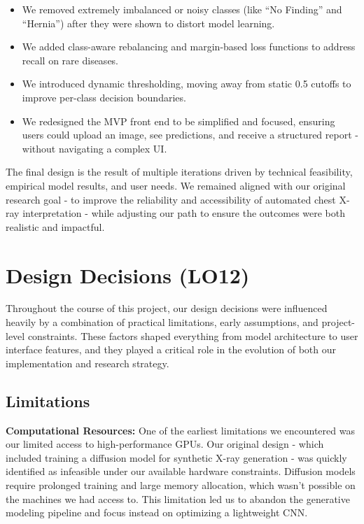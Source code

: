 \documentclass{article}
\begin{document}
\begin{itemize}
    \item We removed extremely imbalanced or noisy classes (like ``No Finding'' and ``Hernia'') after they were shown to distort model learning.
    \item We added class-aware rebalancing and margin-based loss functions to address recall on rare diseases.
    \item We introduced dynamic thresholding, moving away from static 0.5 cutoffs to improve per-class decision boundaries.
    \item We redesigned the MVP front end to be simplified and focused, ensuring users could upload an image, see predictions, and receive a structured report - without navigating a complex UI.
\end{itemize}

The final design is the result of multiple iterations driven by technical feasibility, empirical model results, and user needs. We remained aligned with our original research goal - to improve the reliability and accessibility of automated chest X-ray interpretation - while adjusting our path to ensure the outcomes were both realistic and impactful.

\section{Design Decisions (LO12)}

Throughout the course of this project, our design decisions were influenced heavily by a combination of practical limitations, early assumptions, and project-level constraints. These factors shaped everything from model architecture to user interface features, and they played a critical role in the evolution of both our implementation and research strategy.

\subsection*{Limitations}

\textbf{Computational Resources:} One of the earliest limitations we encountered was our limited access to high-performance GPUs. Our original design - which included training a diffusion model for synthetic X-ray generation - was quickly identified as infeasible under our available hardware constraints. Diffusion models require prolonged training and large memory allocation, which wasn't possible on the machines we had access to. This limitation led us to abandon the generative modeling pipeline and focus instead on optimizing a lightweight CNN.
\end{document}
